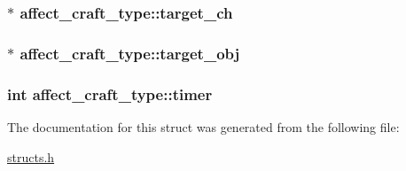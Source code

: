 \hypertarget{structaffect__craft__type_ad3d71166632dffcb09cd945ee3ebdd89}{
\subsubsection[{target\-\_\-ch}]{$\ast$ affect\-\_\-craft\-\_\-type\-::target\-\_\-ch}}\label{structaffect__craft__type_ad3d71166632dffcb09cd945ee3ebdd89}
\hypertarget{structaffect__craft__type_ae487885f5441a7b2d1064e4d0f1973ce}{
\subsubsection[{target\-\_\-obj}]{$\ast$ affect\-\_\-craft\-\_\-type\-::target\-\_\-obj}}\label{structaffect__craft__type_ae487885f5441a7b2d1064e4d0f1973ce}
\hypertarget{structaffect__craft__type_a4e7d13094bc6a1ab21b1798ca2d26024}{
\subsubsection[{timer}]{\setlength{\rightskip}{0pt plus 5cm}int affect\-\_\-craft\-\_\-type\-::timer}}\label{structaffect__craft__type_a4e7d13094bc6a1ab21b1798ca2d26024}


The documentation for this struct was generated from the following file\-:\begin{DoxyCompactItemize}
\item 
\hyperlink{structs_8h}{structs.\-h}\end{DoxyCompactItemize}
